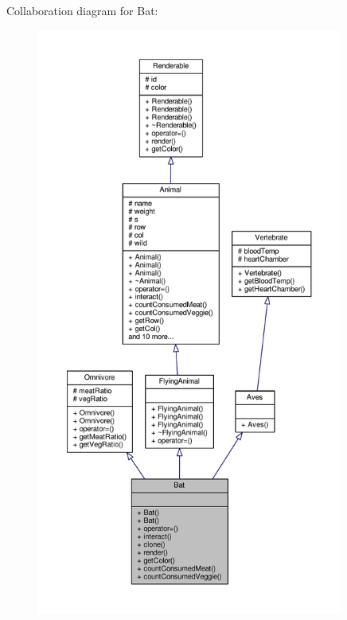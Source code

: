 Collaboration diagram for Bat\+:
\nopagebreak
\begin{figure}[H]
\begin{center}
\leavevmode
\includegraphics[height=550pt]{classBat__coll__graph}
\end{center}
\end{figure}
